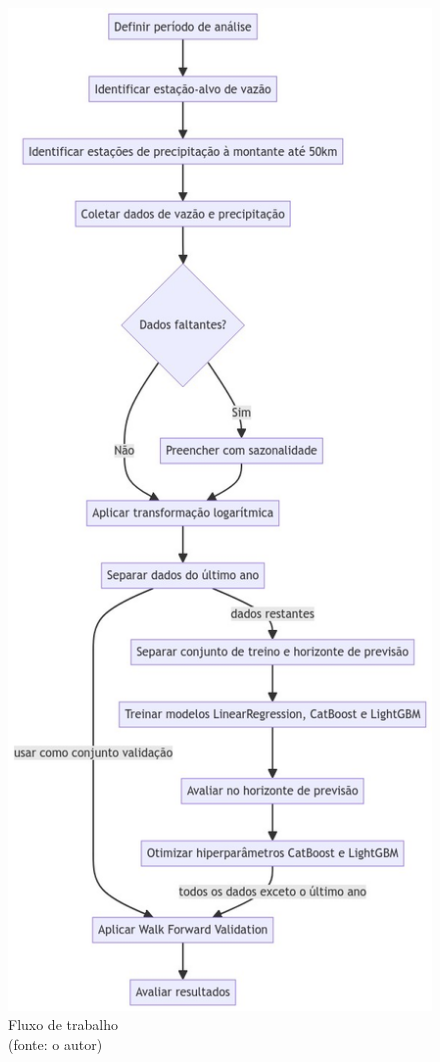 \begin{figure}[!h]
	\centering
	\includegraphics[scale=0.4]{Figuras/flowchart.png}
	\caption{Fluxo de trabalho\\(fonte: o autor)}
	\label{fig:fluxo_trabalho}
\end{figure}
